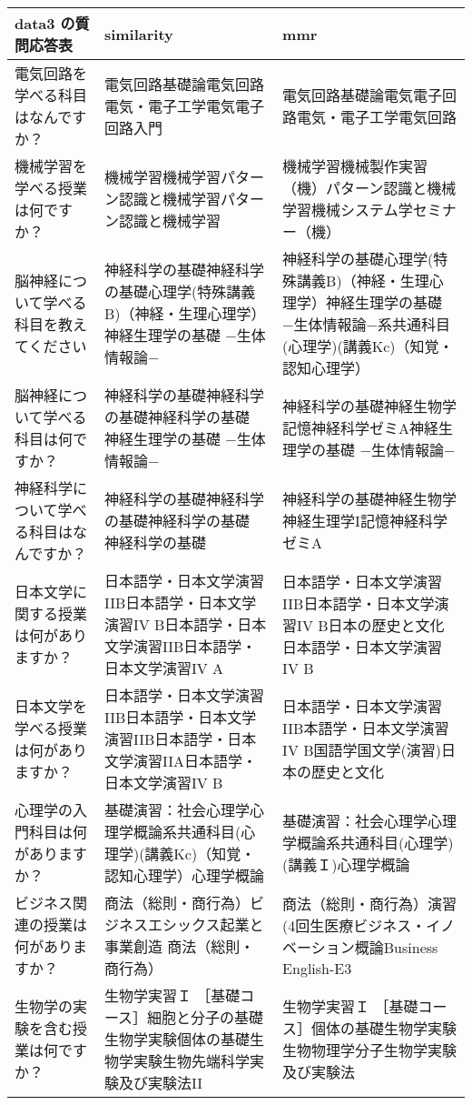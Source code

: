 \begin{table}[h!]
    \centering
    \begin{tabular}{|p{5cm}|p{5cm}|p{5cm}|}
        \hline
        data3 の質問応答表 & similarity & mmr \\ \hline
        電気回路を学べる科目はなんですか？ & 電気回路基礎論電気回路電気・電子工学電気電子回路入門 & 電気回路基礎論電気電子回路電気・電子工学電気回路 \\ \hline
        機械学習を学べる授業は何ですか？ & 機械学習機械学習パターン認識と機械学習パターン認識と機械学習 & 機械学習機械製作実習（機）パターン認識と機械学習機械システム学セミナー（機） \\ \hline
        脳神経について学べる科目を教えてください & 神経科学の基礎神経科学の基礎心理学(特殊講義B)（神経・生理心理学）神経生理学の基礎 −生体情報論− & 神経科学の基礎心理学(特殊講義B)（神経・生理心理学）神経生理学の基礎 −生体情報論−系共通科目(心理学)(講義Kc)（知覚・認知心理学） \\ \hline
        脳神経について学べる科目は何ですか？ & 神経科学の基礎神経科学の基礎神経科学の基礎 神経生理学の基礎 −生体情報論− & 神経科学の基礎神経生物学記憶神経科学ゼミA神経生理学の基礎 −生体情報論− \\ \hline
        神経科学について学べる科目はなんですか？ & 神経科学の基礎神経科学の基礎神経科学の基礎 神経科学の基礎 & 神経科学の基礎神経生物学神経生理学I記憶神経科学ゼミA \\ \hline
        日本文学に関する授業は何がありますか？ & 日本語学・日本文学演習IIB日本語学・日本文学演習IV B日本語学・日本文学演習IIB日本語学・日本文学演習IV A & 日本語学・日本文学演習IIB日本語学・日本文学演習IV B日本の歴史と文化 日本語学・日本文学演習IV B \\ \hline
        日本文学を学べる授業は何がありますか？ & 日本語学・日本文学演習IIB日本語学・日本文学演習IIB日本語学・日本文学演習IIA日本語学・日本文学演習IV B & 日本語学・日本文学演習IIB本語学・日本文学演習IV B国語学国文学(演習)日本の歴史と文化 \\ \hline
        心理学の入門科目は何がありますか？ & 基礎演習：社会心理学心理学概論系共通科目(心理学)(講義Kc)（知覚・認知心理学）心理学概論 & 基礎演習：社会心理学心理学概論系共通科目(心理学)(講義Ｉ)心理学概論 \\ \hline
        ビジネス関連の授業は何がありますか？ & 商法（総則・商行為）ビジネスエシックス起業と事業創造 商法（総則・商行為） & 商法（総則・商行為）演習(4回生医療ビジネス・イノベーション概論Business English-E3 \\ \hline
        生物学の実験を含む授業は何ですか？ & 生物学実習Ｉ ［基礎コース］細胞と分子の基礎生物学実験個体の基礎生物学実験生物先端科学実験及び実験法II & 生物学実習Ｉ ［基礎コース］個体の基礎生物学実験生物物理学分子生物学実験及び実験法 \\ \hline

\end{tabular}
\end{table}
